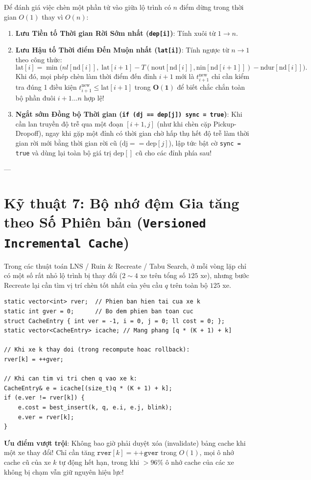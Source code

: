 \documentclass[11pt,a4paper]{article}
\begin{document}
Để đánh giá việc chèn một phần tử vào giữa lộ trình có $n$ điểm dừng trong thời gian $O(1)$ thay vì $O(n)$:
\begin{enumerate}[leftmargin=1.5em]
    \item \textbf{Lưu Tiền tố Thời gian Rời Sớm nhất (\texttt{dep[i]})}: Tính xuôi từ $1 \to n$.
    \item \textbf{Lưu Hậu tố Thời điểm Đến Muộn nhất (\texttt{lat[i]})}: Tính ngược từ $n \to 1$ theo công thức:
    \[
        \text{lat}[i] = \min\Big(nl[\text{nd}[i]], \; \text{lat}[i+1] - T(\text{nout}[\text{nd}[i]], \text{nin}[\text{nd}[i+1]]) - \text{ndur}[\text{nd}[i]]\Big).
    \]
    Khi đó, mọi phép chèn làm thời điểm đến đỉnh $i+1$ mới là $t^{\text{new}}_{i+1}$ chỉ cần kiểm tra đúng 1 điều kiện $t^{\text{new}}_{i+1} \le \text{lat}[i+1]$ trong $\mathbf{O(1)}$ để biết chắc chắn toàn bộ phần đuôi $i+1 \dots n$ hợp lệ!
    \item \textbf{Ngắt sớm Đồng bộ Thời gian (\texttt{if (dj == dep[j]) sync = true})}: Khi cần lan truyền độ trễ qua một đoạn $[i+1, j]$ (như khi chèn cặp Pickup-Dropoff), ngay khi gặp một đỉnh có thời gian chờ hấp thụ hết độ trễ làm thời gian rời mới bằng thời gian rời cũ ($\text{dj} == \text{dep}[j]$), lập tức bật cờ \texttt{sync = true} và dùng lại toàn bộ giá trị $\text{dep}[]$ cũ cho các đỉnh phía sau!
\end{enumerate}

---

\section{Kỹ thuật 7: Bộ nhớ đệm Gia tăng theo Số Phiên bản (\texttt{Versioned Incremental Cache})}

Trong các thuật toán LNS / Ruin \& Recreate / Tabu Search, ở mỗi vòng lặp chỉ có một số rất nhỏ lộ trình bị thay đổi ($2\sim 4$ xe trên tổng số $125$ xe), nhưng bước Recreate lại cần tìm vị trí chèn tốt nhất của yêu cầu $q$ trên toàn bộ $125$ xe.
\begin{lstlisting}
static vector<int> rver;  // Phien ban hien tai cua xe k
static int gver = 0;      // Bo dem phien ban toan cuc
struct CacheEntry { int ver = -1, i = 0, j = 0; ll cost = 0; };
static vector<CacheEntry> icache; // Mang phang [q * (K + 1) + k]

// Khi xe k thay doi (trong recompute hoac rollback):
rver[k] = ++gver;

// Khi can tim vi tri chen q vao xe k:
CacheEntry& e = icache[(size_t)q * (K + 1) + k];
if (e.ver != rver[k]) {
    e.cost = best_insert(k, q, e.i, e.j, blink);
    e.ver = rver[k];
}
\end{lstlisting}
\textbf{Ưu điểm vượt trội}: Không bao giờ phải duyệt xóa (invalidate) bảng cache khi một xe thay đổi! Chỉ cần tăng $\texttt{rver}[k] = \texttt{++gver}$ trong $O(1)$, mọi ô nhớ cache cũ của xe $k$ tự động hết hạn, trong khi $>96\%$ ô nhớ cache của các xe không bị chạm vẫn giữ nguyên hiệu lực!
\end{document}
